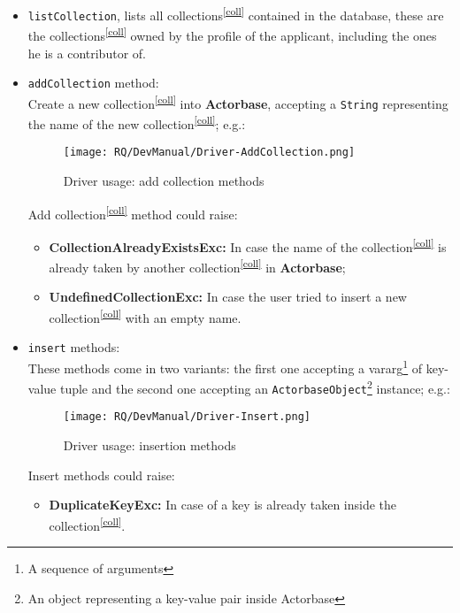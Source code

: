 \documentclass{scalatekids-article}
\begin{document}
\begin{itemize}
\item \verb=listCollection=, lists all collections\textsuperscript{\ref{coll}}
  contained in the database, these are the collections\textsuperscript{\ref{coll}}
  owned by the profile of the applicant, including the ones he is a contributor of.
\item \verb=addCollection= method:\\ Create a new collection\textsuperscript{\ref{coll}} into \textbf{Actorbase}, accepting a \verb=String=
  representing the name of the new collection\textsuperscript{\ref{coll}};
  e.g.:
   \begin{figure}[H]
     \begin{center}
       \texttt{[image: RQ/DevManual/Driver-AddCollection.png]}
       \caption{Driver usage: add collection  methods}
     \end{center}
   \end{figure}
  Add collection\textsuperscript{\ref{coll}} method could raise:
  \begin{itemize}
  \item \textbf{CollectionAlreadyExistsExc:} In case the name of the collection\textsuperscript{\ref{coll}} is already taken by another collection\textsuperscript{\ref{coll}} in \textbf{Actorbase};
  \item \textbf{UndefinedCollectionExc:} In case the user tried to insert a new collection\textsuperscript{\ref{coll}} with an empty name.
  \end{itemize}
\item \verb=insert= methods:\\ These methods come in two variants: the first one accepting
  a vararg\footnote{A sequence of arguments} of key-value tuple and the second
  one accepting an
  \verb=ActorbaseObject=\footnote{An object representing a key-value pair inside Actorbase\label{ABobj}} instance;
  e.g.:
   \begin{figure}[H]
     \begin{center}
       \texttt{[image: RQ/DevManual/Driver-Insert.png]}
       \caption{Driver usage: insertion methods}
     \end{center}
   \end{figure}
  Insert methods could raise:
  \begin{itemize}
  \item \textbf{DuplicateKeyExc:} In case of a key is already taken inside the collection\textsuperscript{\ref{coll}}.

\end{itemize}
\end{itemize}
\end{document}
